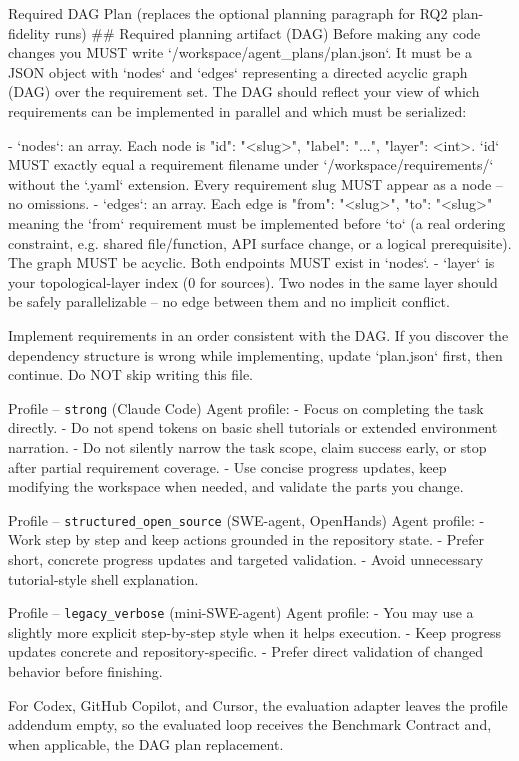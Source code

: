 \begin{promptbox}{Required DAG Plan \textnormal{(replaces the optional planning paragraph for RQ2 plan-fidelity runs)}}
## Required planning artifact (DAG)
Before making any code changes you MUST write `/workspace/agent_plans/plan.json`.
It must be a JSON object with `nodes` and `edges` representing a directed acyclic
graph (DAG) over the requirement set. The DAG should reflect your view of which
requirements can be implemented in parallel and which must be serialized:

- `nodes`: an array. Each node is {"id": "<slug>", "label": "...", "layer": <int>}.
  `id` MUST exactly equal a requirement filename under `/workspace/requirements/`
  without the `.yaml` extension. Every requirement slug MUST appear as a node --
  no omissions.
- `edges`: an array. Each edge is {"from": "<slug>", "to": "<slug>"} meaning the
  `from` requirement must be implemented before `to` (a real ordering constraint,
  e.g. shared file/function, API surface change, or a logical prerequisite). The
  graph MUST be acyclic. Both endpoints MUST exist in `nodes`.
- `layer` is your topological-layer index (0 for sources). Two nodes in the same
  layer should be safely parallelizable -- no edge between them and no implicit
  conflict.

Implement requirements in an order consistent with the DAG. If you discover the
dependency structure is wrong while implementing, update `plan.json` first, then
continue. Do NOT skip writing this file.
\end{promptbox}

\begin{promptbox}{Profile -- \textnormal{\texttt{strong} (Claude Code)}}
Agent profile:
- Focus on completing the task directly.
- Do not spend tokens on basic shell tutorials or extended environment narration.
- Do not silently narrow the task scope, claim success early, or stop after partial
  requirement coverage.
- Use concise progress updates, keep modifying the workspace when needed, and
  validate the parts you change.
\end{promptbox}

\begin{promptbox}{Profile -- \textnormal{\texttt{structured\_open\_source} (SWE-agent, OpenHands)}}
Agent profile:
- Work step by step and keep actions grounded in the repository state.
- Prefer short, concrete progress updates and targeted validation.
- Avoid unnecessary tutorial-style shell explanation.
\end{promptbox}

\begin{promptbox}{Profile -- \textnormal{\texttt{legacy\_verbose} (mini-SWE-agent)}}
Agent profile:
- You may use a slightly more explicit step-by-step style when it helps execution.
- Keep progress updates concrete and repository-specific.
- Prefer direct validation of changed behavior before finishing.
\end{promptbox}

For Codex, GitHub Copilot, and Cursor, the evaluation adapter leaves the profile addendum empty, so the evaluated loop receives the Benchmark Contract and, when applicable, the DAG plan replacement.
